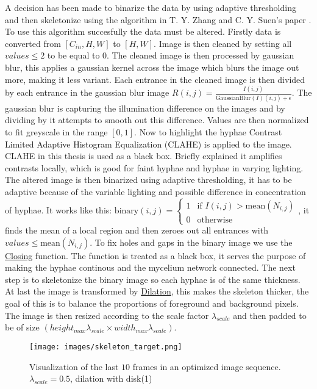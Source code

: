 \documentclass[a4paper,12pt]{article}
\begin{document}
A decision has been made to binarize the data by using adaptive thresholding and then skeletonize using the algorithm in T. Y. Zhang and C. Y. Suen's paper \cite{10.1145/357994.358023}. To use this algorithm succesfully the data must be altered. Firstly data is converted from $[C_{in}, H, W]$ to $[H, W]$. Image is then cleaned by setting all $values \leq 2$ to be equal to $0$. The cleaned image is then processed by gaussian blur, this applies a gaussian kernel across the image which blurs the image out more, making it less variant. Each entrance in the cleaned image is then divided by each entrance in the gaussian blur image $R(i, j) = \frac{I(i, j)}{\text{GaussianBlur}(I)(i, j) + \epsilon}$.
The gaussian blur is capturing the illumination difference on the images and by dividing by it attempts to smooth out this difference. Values are then normalized to fit greyscale in the range $[0, 1]$. Now to highlight the hyphae Contrast Limited Adaptive Histogram Equalization (CLAHE) is applied to the image. CLAHE in this thesis is used as a black box. Briefly explained it amplifies contrasts locally, which is good for faint hyphae and hyphae in varying lighting. The altered image is then binarized using adaptive thresholding, it has to be adaptive because of the variable lighting and possible difference in concentration of hyphae. It works like this: $\text{binary}(i,j) = 
\begin{cases}
1 & \text{if } I(i,j) > \text{mean}(N_{i,j}) \\
0 & \text{otherwise}
\end{cases}$, it finds the mean of a local region and then zeroes out all entrances with $values \leq \text{mean}(N_{i,j})$. To fix holes and gaps in the binary image we use the \href{https://github.com/scikit-image/scikit-image/blob/v0.25.2/skimage/morphology/gray.py#L443-L517}{Closing} function. The function is treated as a black box, it serves the purpose of making the hyphae continous and the mycelium network connected. The next step is to skeletonize the binary image so each hyphae is of the same thickness. At last the image is transformed by \href{https://github.com/scikit-image/scikit-image/blob/v0.25.2/skimage/morphology/gray.py#L245-L363}{Dilation}, this makes the skeleton thicker, the goal of this is to balance the proportions of foreground and background pixels.
 The image is then resized according to the scale factor $\lambda_{scale}$ and then padded to be of size $(height_{max}\lambda_{scale} \times width_{max}\lambda_{scale})$. 
\begin{figure}[H]
  \centering
  \texttt{[image: images/skeleton\_target.png]}
  \caption{Visualization of the last $10$ frames in an optimized image sequence. $\lambda_{scale}=0.5$, dilation with disk(1)} %
  \label{fig:n12}
\end{figure}
\end{document}
